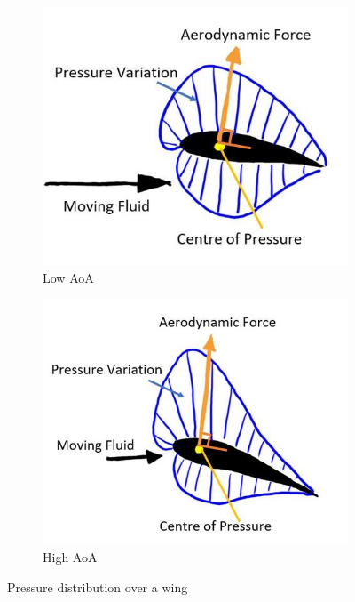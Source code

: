 \begin{figure}[H]
     \centering
     \begin{subfigure}[b]{0.45\textwidth}
         \centering
         \includegraphics[width=\textwidth]{02_Background/Figs/smol.JPG}
         \caption{Low \acrshort{AoA}}
         \label{fig:Press2a}
     \end{subfigure}
     \hfill
     \begin{subfigure}[b]{0.45\textwidth}
         \centering
         \includegraphics[width=\textwidth]{02_Background/Figs/big.JPG}
         \caption{High \acrshort{AoA}}
         \label{fig:Press2b}
     \end{subfigure}
     \hfill
        \caption{Pressure distribution over a wing}
        \label{fig:pressureWing}
\end{figure}



